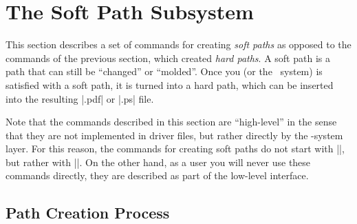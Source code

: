 %
%
%


\section{The Soft Path Subsystem}
\label{section-soft-paths}

\makeatletter

This section describes a set of commands for creating \emph{soft paths} as
opposed to the commands of the previous section, which created \emph{hard
paths}. A soft path is a path that can still be ``changed'' or ``molded''. Once
you (or the \pgfname\ system) is satisfied with a soft path, it is turned into
a hard path, which can be inserted into the resulting |.pdf| or |.ps| file.

Note that the commands described in this section are ``high-level'' in the
sense that they are not implemented in driver files, but rather directly by the
\pgfname-system layer. For this reason, the commands for creating soft paths do
not start with |\pgfsys@|, but rather with |\pgfsyssoftpath@|. On the other
hand, as a user you will never use these commands directly, they are described
as part of the low-level interface.


\subsection{Path Creation Process}

